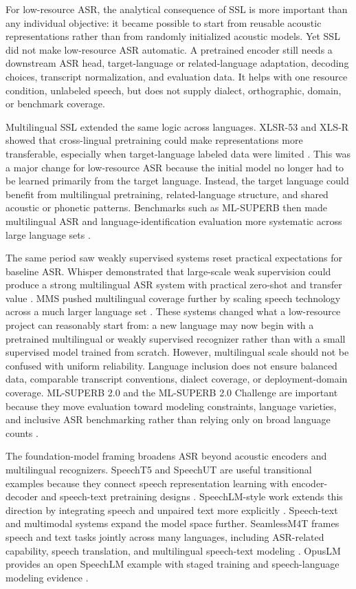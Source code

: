 \documentclass[pdflatex,sn-basic]{sn-jnl}
\theoremstyle{thmstyleone}
\theoremstyle{thmstyletwo}
\theoremstyle{thmstylethree}
\begin{document}
For low-resource ASR, the analytical consequence of SSL is more important than any individual objective: it became possible to start from reusable acoustic representations rather than from randomly initialized acoustic models. Yet SSL did not make low-resource ASR automatic. A pretrained encoder still needs a downstream ASR head, target-language or related-language adaptation, decoding choices, transcript normalization, and evaluation data. It helps with one resource condition, unlabeled speech, but does not supply dialect, orthographic, domain, or benchmark coverage.

Multilingual SSL extended the same logic across languages. XLSR-53 and XLS-R showed that cross-lingual pretraining could make representations more transferable, especially when target-language labeled data were limited \citep{conneau21_interspeech,babu22_interspeech}. This was a major change for low-resource ASR because the initial model no longer had to be learned primarily from the target language. Instead, the target language could benefit from multilingual pretraining, related-language structure, and shared acoustic or phonetic patterns. Benchmarks such as ML-SUPERB then made multilingual ASR and language-identification evaluation more systematic across large language sets \citep{shi2023mlsuperb}.

The same period saw weakly supervised systems reset practical expectations for baseline ASR. Whisper demonstrated that large-scale weak supervision could produce a strong multilingual ASR system with practical zero-shot and transfer value \citep{pmlr-v202-radford23a}. MMS pushed multilingual coverage further by scaling speech technology across a much larger language set \citep{pratap2024mms}. These systems changed what a low-resource project can reasonably start from: a new language may now begin with a pretrained multilingual or weakly supervised recognizer rather than with a small supervised model trained from scratch. However, multilingual scale should not be confused with uniform reliability. Language inclusion does not ensure balanced data, comparable transcript conventions, dialect coverage, or deployment-domain coverage. ML-SUPERB 2.0 and the ML-SUPERB 2.0 Challenge are important because they move evaluation toward modeling constraints, language varieties, and inclusive ASR benchmarking rather than relying only on broad language counts \citep{shi2024mlsuperb2,chen2025mlsuperb2challenge}.

The foundation-model framing broadens ASR beyond acoustic encoders and multilingual recognizers. SpeechT5 and SpeechUT are useful transitional examples because they connect speech representation learning with encoder-decoder and speech-text pretraining designs \citep{ao2022speecht5,zhang2022speechut}. SpeechLM-style work extends this direction by integrating speech and unpaired text more explicitly \citep{zhang2024_speechlm}. Speech-text and multimodal systems expand the model space further. SeamlessM4T frames speech and text tasks jointly across many languages, including ASR-related capability, speech translation, and multilingual speech-text modeling \citep{seamless2025_joint_speech_text_mt}. OpusLM provides an open SpeechLM example with staged training and speech-language modeling evidence \citep{tian25b_interspeech}.
\end{document}
